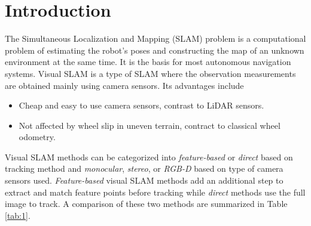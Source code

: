 \documentclass[letterpaper, 10 pt, conference]{IEEEtran}
\begin{document}
\section{Introduction} \label{sect:\thesection}
The Simultaneous Localization and Mapping (SLAM) problem is a computational 
problem of estimating the robot's poses and constructing the map of an unknown
environment at the same time. It is the basis for most autonomous navigation 
systems. Visual SLAM is a type of SLAM where the observation measurements are 
obtained mainly using camera sensors. Its advantages include
\begin{itemize}
    \item Cheap and easy to use camera sensors, contrast to LiDAR sensors.
    \item Not affected by wheel slip in uneven terrain, contract to classical 
    wheel odometry. 
\end{itemize}

Visual SLAM methods can be categorized into \textit{feature-based} or 
\textit{direct} based on tracking method and \textit{monocular}, 
\textit{stereo}, or \textit{RGB-D} based on type of camera sensors used.
\textit{Feature-based} visual SLAM methods add an additional step to extract 
and match feature points before tracking while \textit{direct} methods use 
the full image to track. A comparison of these two methods are summarized in 
Table \ref{tab:1}. 
\end{document}
